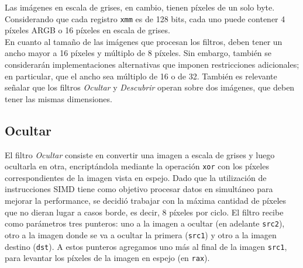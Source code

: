 \documentclass[a4paper]{article}
\begin{document}
Las imágenes en escala de grises, en cambio, tienen píxeles de un solo byte.
Considerando que cada registro {\tt xmm} es de 128 bits, cada uno puede contener 4 píxeles ARGB o 16 píxeles en escala de grises. \\
En cuanto al tamaño de las imágenes que procesan los filtros, deben tener un ancho mayor a 16 píxeles y múltiplo de 8 píxeles. Sin embargo, también se considerarán implementaciones alternativas que imponen restricciones adicionales; en particular, que el ancho sea múltiplo de 16 o de 32.
También es relevante señalar que los filtros \textit{Ocultar} y \textit{Descubrir} operan sobre dos imágenes, que deben tener las mismas dimensiones. 

\subsection{Ocultar}
El filtro \textit{Ocultar} consiste en convertir una imagen a escala de grises y luego ocultarla en otra, encriptándola mediante la operación {\tt xor} con los píxeles correspondientes de la imagen vista en espejo.
Dado que la utilización de instrucciones SIMD tiene como objetivo procesar datos en simultáneo para mejorar la performance, se decidió trabajar con la máxima cantidad de píxeles que no dieran lugar a casos borde, es decir, 8 píxeles por ciclo.
El filtro recibe como parámetros tres punteros: uno a la imagen a ocultar (en adelante {\tt src2}), otro a la imagen donde se va a ocultar la primera ({\tt src1}) y otro a la imagen destino ({\tt dst}). A estos punteros agregamos uno más al final de la imagen {\tt src1}, para levantar los píxeles de la imagen en espejo (en {\tt rax}).
\end{document}
